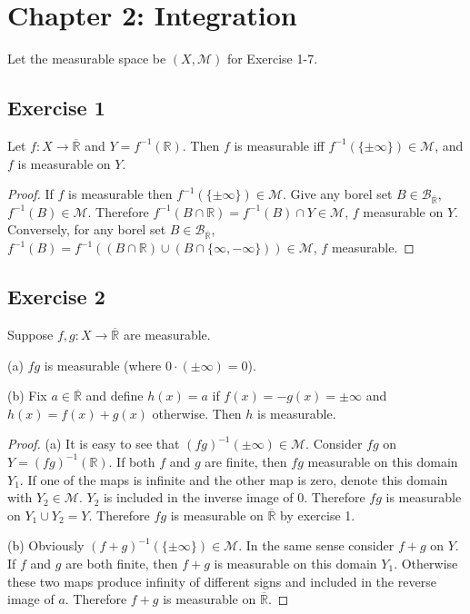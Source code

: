\section{Chapter 2: Integration}
Let the measurable space be $(X,\mathcal{M})$ for Exercise 1-7.
\subsection*{Exercise 1}
Let $f:X\to\overline{\mathbb{R}}$ and $Y=f^{-1}(\mathbb{R})$. Then $f$ is measurable iff $f^{-1}(\{\pm\infty\})\in\mathcal{M}$, and $f$ is measurable on $Y$.
\begin{proof}
    If $f$ is measurable then $f^{-1}(\{\pm\infty\})\in\mathcal{M}$. Give any borel set $B\in\mathcal{B}_{\overline{\mathbb{R}}}$, $f^{-1}(B)\in\mathcal{M}$. Therefore $f^{-1}(B\cap\mathbb{R})=f^{-1}(B)\cap Y\in\mathcal{M}$, $f$ measurable on $Y$. Conversely, for any borel set $B\in\mathcal{B}_{\overline{\mathbb{R}}}$, $f^{-1}(B)=f^{-1}((B\cap\mathbb{R})\cup(B\cap\{\infty,-\infty\}))\in\mathcal{M}$, $f$ measurable.
\end{proof}
\subsection*{Exercise 2}
Suppose $f,g:X\to\overline{\mathbb{R}}$ are measurable.
\par (a) $fg$ is measurable (where $0\cdot(\pm\infty)=0$).
\par (b) Fix $a\in\overline{\mathbb{R}}$ and define $h(x)=a$ if $f(x)=-g(x)=\pm\infty$ and $h(x)=f(x)+g(x)$ otherwise. Then $h$ is measurable.
\begin{proof}
    (a) It is easy to see that $(fg)^{-1}(\pm\infty)\in\mathcal{M}$. Consider $fg$ on $Y=(fg)^{-1}(\mathbb{R})$. If both $f$ and $g$ are finite, then $fg$ measurable on this domain $Y_1$. If one of the maps is infinite and the other map is zero, denote this domain with $Y_2\in\mathcal{M}$. $Y_2$ is included in the inverse image  of $0$. Therefore $fg$ is measurable on $Y_1\cup Y_2=Y$. Therefore $fg$ is measurable on $\overline{\mathbb{R}}$ by exercise 1.
    \par (b) Obviously $(f+g)^{-1}(\{\pm\infty\})\in\mathcal{M}$. In the same sense consider $f+g$ on $Y$. If $f$ and $g$ are both finite, then $f+g$ is measurable on this domain $Y_1$. Otherwise these two maps produce infinity of different signs and included in the reverse image of $a$. Therefore $f+g$ is measurable on $\overline{\mathbb{R}}$. 
\end{proof}
